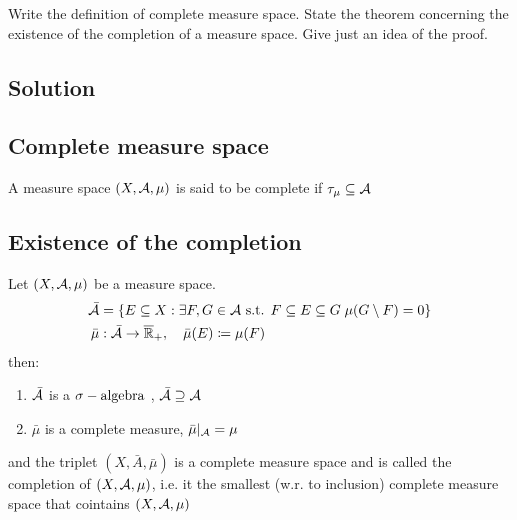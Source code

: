 \sheet



\question
Write the definition of complete measure space. State the theorem concerning the existence of the completion of a measure space. Give just an idea of the proof.

\subsection*{Solution}

\subsection{Complete measure space}
A measure space $(X,\mathcal{A},\mu)$ is said to be complete if $\tau_{\mu}\subseteq\mathcal{A}$

\subsection{Existence of the completion}
Let $(X,\mathcal{A},\mu)$ be a measure space. \provdef{$\bar{\A}, \bar{\mu}$}
\begin{align*}
    \bar{\mathcal{A}}  & =\{ E\subseteq X: \exists F,G \in \mathcal{A} \text{ s.t. } F\subseteq E \subseteq G \; \mu(G \setminus F) =0 \} \\
    \bar{\mu} & : \bar{\mathcal{A}}\to\overline{\mathbb{R}}_{+},\quad \bar{\mu}(E) \coloneqq \mu(F)
\end{align*}
then:
\begin{enumerate}
    \item $\bar{\mathcal{A}}$ is a $\sigma-\text{algebra}$ , $\bar{\mathcal{A}} \supseteq \mathcal{A}$
    \item $\bar{\mu}$ is a complete measure, $\bar{\mu}|_{\mathcal{A}}=\mu$
\end{enumerate}
and the triplet $(X,\bar{A}, \bar{\mu})$ is a complete measure space and is called the completion of $(X,\mathcal{A},\mu)$, i.e. it the smallest (w.r. to inclusion) complete measure space that cointains $(X,\mathcal{A},\mu)$
